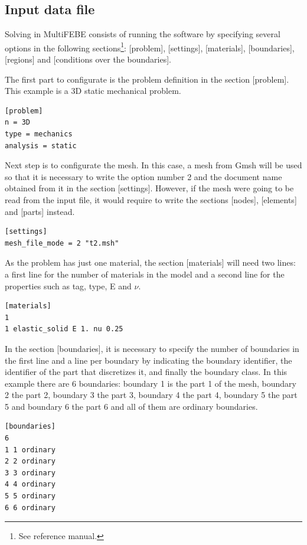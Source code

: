 \documentclass[a4]{article}
\begin{document}
\subsection{Input data file}
Solving in MultiFEBE consists of running the software by specifying several options in the following sections\footnote{See reference manual.}: [problem], [settings], [materials], [boundaries], [regions] and [conditions over the boundaries].

The first part to configurate is the problem definition in the section [problem]. This example is a 3D static mechanical problem.  

\begin{Verbatim}	
[problem]
n = 3D
type = mechanics
analysis = static
\end{Verbatim}

Next step is to configurate the mesh. In this case, a mesh from Gmsh will be used so that it is necessary to write the option number 2 and the document name obtained from it in the section [settings]. However, if the mesh were going to be read from the input file, it would require to write the sections [nodes], [elements] and [parts] instead.

\begin{Verbatim}	
[settings]
mesh_file_mode = 2 "t2.msh"
\end{Verbatim}

As the problem has just one material, the section [materials] will need two lines: a first line for the number of materials in the model and a second line for the properties such as tag, type, E and $\nu$.

\begin{Verbatim}	
[materials]
1
1 elastic_solid E 1. nu 0.25
\end{Verbatim}

In the section [boundaries], it is necessary to specify the number of boundaries in the first line and a line per boundary by indicating the boundary identifier, the identifier of the part that discretizes it, and finally the boundary class. In this example there are 6 boundaries: boundary 1 is the part 1 of the mesh, boundary 2 the part 2, boundary 3 the part 3, boundary 4 the part 4, boundary 5 the part 5 and boundary 6 the part 6 and all of them are ordinary boundaries.

\begin{Verbatim}	
[boundaries]
6
1 1 ordinary
2 2 ordinary
3 3 ordinary
4 4 ordinary
5 5 ordinary
6 6 ordinary
\end{Verbatim}
\end{document}
